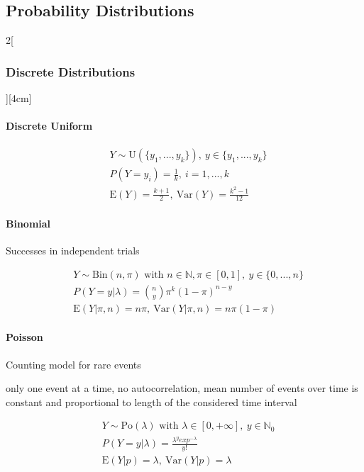 \documentclass[8pt]{extarticle}
\begin{document}
\subsection{Probability Distributions}

\begin{multicols}{2}[\subsubsection{Discrete Distributions}][4cm]

  \paragraph{Discrete Uniform}
  
    \begin{align*}
    & Y \sim \mathrm{U}(\{y_1, ..., y_k\}),\: y \in \{y_1, ..., y_k\} \\
    & P(Y=y_i) =\frac{1}{k},\: i = 1, ...,k \\
    & \mathrm{E}(Y) = \frac{k+1}{2} ,\: \mathrm{Var}(Y) = \frac{k^2 - 1}{12}
  \end{align*}
  
    \paragraph{Binomial}
  Successes in independent trials 

  \begin{align*}
    & Y \sim \mathrm{Bin}(n, \pi) \text{ with } n \in \mathbb{N}, \pi \in \left[0,1\right] ,\: y \in \{0, ..., n\} \\
    & P(Y=y|\lambda) = \binom{n}{y}\pi^k(1-\pi)^{n-y} \\
    & \mathrm{E}(Y|\pi,n) = n\pi ,\: \mathrm{Var}(Y|\pi,n) = n\pi(1-\pi)
  \end{align*}

  \paragraph{Poisson}
  Counting model for rare events

\noindent only one event at a time, no autocorrelation, mean number of events over time is constant and proportional to length of the considered time interval 

  \begin{align*}
    & Y \sim \mathrm{Po}(\lambda) \text{ with } \lambda \in \left[ 0, + \infty \right] ,\: y \in \mathbb{N}_0 \\
    & P(Y=y|\lambda) =\frac{\lambda^y exp^{-\lambda}}{y!} \\
    & \mathrm{E}(Y|p) = \lambda ,\: \mathrm{Var}(Y|p) = \lambda
  \end{align*}


\end{multicols}
\end{document}

